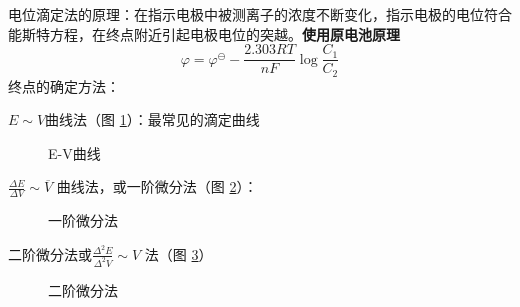 电位滴定法的原理：在指示电极中被测离子的浓度不断变化，指示电极的电位符合能斯特方程，在终点附近引起电极电位的突越。\textbf{使用原电池原理}
\begin{equation}
    \varphi = \varphi^\ominus -\frac{2.303RT}{nF}\log \frac{C_1}{C_2} 
\end{equation}
终点的确定方法：
\begin{notation}
    $E\sim V$曲线法（图 \ref{fig:e-v曲线}）：最常见的滴定曲线
\begin{figure}[ht!]
    \centering
    \caption{E-V曲线}
    \label{fig:e-v曲线}
\end{figure}
\end{notation}
\begin{notation}
$\frac{\Delta E}{\Delta V}\sim \overline{V}$ 曲线法，或一阶微分法（图 \ref{fig:一阶微分法}）：
\begin{figure}[ht!]
    \centering
    \caption{一阶微分法}
    \label{fig:一阶微分法}
\end{figure}
\end{notation}
\begin{notation}
    二阶微分法或$\frac{\Delta^2 E}{\Delta^2 V}\sim V$ 法（图 \ref{fig:二阶微分法}）
\begin{figure}[ht!]
    \centering
    \caption{二阶微分法}
    \label{fig:二阶微分法}
\end{figure}
\end{notation}
